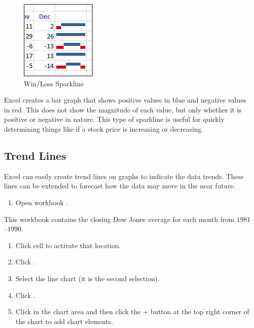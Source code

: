 \begin{figure}[H]
	\centering
	\includegraphics[width=\maxwidth{.95\linewidth}]{gfx/ch08_fig06}
	\caption{Win/Loss Sparkline}
	\label{08:fig06}
\end{figure}

Excel creates a bar graph that shows positive values in blue and negative values in red. This does not show the magnitude of each value, but only whether it is positive or negative in nature. This type of sparkline is useful for quickly determining things like if a stock price is increasing or decreasing.

\subsection{Trend Lines}

Excel can easily create trend lines on graphs to indicate the data trends. These lines can be extended to forecast how the data may move in the near future.

\begin{enumerate}
	\item Open workbook .
\end{enumerate}

This workbook contains the closing Dow Jones average for each month from $ 1981 $–$ 1990 $.

\begin{enumerate}[resume]
	\item Click cell  to activate that location.
	\item Click .
	\item Select the line chart (it is the second selection).
	\item Click .
	\item Click in the chart area and then click the $ + $ button at the top right corner of the chart to add chart elements.

\end{enumerate}


